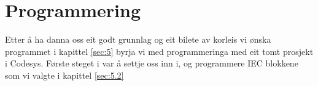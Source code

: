 \chapter{Programmering}
\thispagestyle{fancy}
Etter å ha danna oss eit godt grunnlag og eit bilete av korleis vi ønska programmet i kapittel \ref{sec:5} 
byrja vi med programmeringa med eit tomt prosjekt i \gls{Codesys}. Første steget i var å 
settje oss inn i, og programmere \gls{IEC} blokkene som vi valgte i kapittel \ref{sec:5.2}


